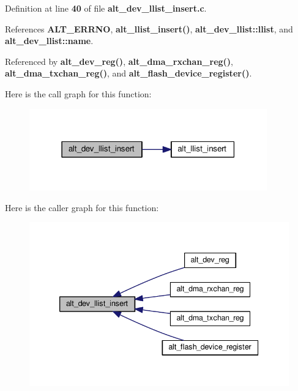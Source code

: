 Definition at line {\bf 40} of file {\bf alt\+\_\+dev\+\_\+llist\+\_\+insert.\+c}.



References {\bf A\+L\+T\+\_\+\+E\+R\+R\+NO}, {\bf alt\+\_\+llist\+\_\+insert()}, {\bf alt\+\_\+dev\+\_\+llist\+::llist}, and {\bf alt\+\_\+dev\+\_\+llist\+::name}.



Referenced by {\bf alt\+\_\+dev\+\_\+reg()}, {\bf alt\+\_\+dma\+\_\+rxchan\+\_\+reg()}, {\bf alt\+\_\+dma\+\_\+txchan\+\_\+reg()}, and {\bf alt\+\_\+flash\+\_\+device\+\_\+register()}.



Here is the call graph for this function\+:
\nopagebreak
\begin{figure}[H]
\begin{center}
\leavevmode
\includegraphics[width=291pt]{d0/d59/alt__dev__llist__insert_8c_a1c5c3fa576f4308fb670b68a35ba437d_cgraph}
\end{center}
\end{figure}




Here is the caller graph for this function\+:
\nopagebreak
\begin{figure}[H]
\begin{center}
\leavevmode
\includegraphics[width=339pt]{d0/d59/alt__dev__llist__insert_8c_a1c5c3fa576f4308fb670b68a35ba437d_icgraph}
\end{center}
\end{figure}



